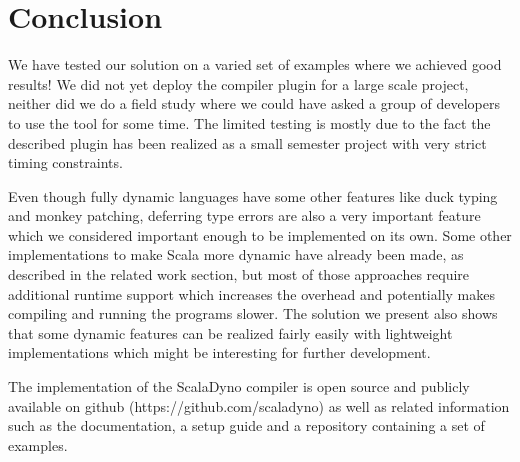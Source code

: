 \section{Conclusion}
We have tested our solution on a varied set of examples where we achieved good results! We did not yet deploy the compiler plugin for a large scale project, neither did we do a field study where we could have asked a group of developers to use the tool for some time. The limited testing is mostly due to the fact the described plugin has been realized as a small semester project with very strict timing constraints.

Even though fully dynamic languages have some other features like duck typing and monkey patching, deferring type errors are also a very important feature which we considered important enough to be implemented on its own. Some other implementations to make Scala more dynamic have already been made, as described in the related work section, but most of those approaches require additional runtime support which increases the overhead and potentially makes compiling and running the programs slower. The solution we present also shows that some dynamic features can be realized fairly easily with lightweight implementations which might be interesting for further development.

The implementation of the ScalaDyno compiler is open source and publicly available on github (https://github.com/scaladyno) as well as related information such as the documentation, a setup guide and a repository containing a set of examples.